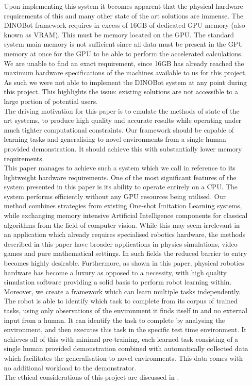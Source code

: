 Upon implementing this system it becomes apparent that the physical hardware requirements of this and many other state of the art solutions are immense. The DINOBot framework requires in excess of 16GB of dedicated GPU memory (also known as VRAM). This must be memory located on the GPU. The standard system main memory is not sufficient since all data must be present in the GPU memory at once for the GPU to be able to perform the accelerated calculations. We are unable to find an exact requirement, since 16GB has already reached the maximum hardware specifications of the machines available to us for this project. As such we were not able to implement the DINOBot system at any point during this project. 
This highlights the issue: existing solutions are not accessible to a large portion of potential users.\\

The driving motivation for this paper is to emulate the methods of state of the art systems, to produce high quality and accurate results while operating under much tighter computational constraints. Our framework should be capable of learning tasks and generalising to novel environments from a single human provided demonstration. It should achieve this with substantially lower memory requirements.\\

This paper manages to achieve such a system which we call  in reference to its lightweight hardware requirements. One of the most significant features of the system presented in this paper is its ability to operate entirely on a CPU. The system performs efficiently without any GPU resources being utilised. Our method combines strategies from existing One-shot Imitation Learning systems, while exchanging memory intensive Artificial Intelligence components for classical algorithms from the field of computer vision. While this may seem irrelevant in an application which already requires specialised robotics hardware, the methods described in this paper have broader applications in physics simulations, video games and pure mathematical settings. In such fields the reduced barrier to entry becomes highly desirable. Furthermore, as shown in this paper, physical robotics hardware has become a luxury as opposed to a necessity, with high quality simulation software providing a solid basis to perform robot learning within. Moreover, we create a framework which can learn multiple tasks independently. The robot is able to identify which task to complete from its corpus of trained tasks, using only observations of the environment it finds itself in and no external input from a human. It can identify the task to complete by analysing the environment, and then executes this task in the specific test time environment. It achieves all of this with minimal pre-training, each learned task consisting of a single human provided demonstration combined with automatically collected data which facilitates the generalisation to novel environments. This data comes with no additional workload to the demonstrator.\\

The ethical considerations of this project are discussed in .